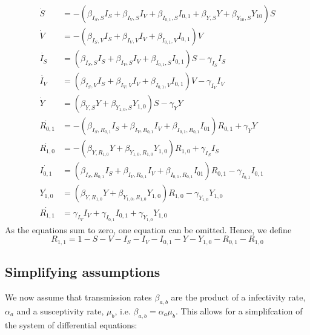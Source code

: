 \documentclass[10pt,a4paper]{article}
\begin{document}
\begin{align}
    \dot{S} &= - \left(\beta_{I_S,S} I_S + \beta_{I_{V},S} I_V  + \beta_{I_{0,1},S} I_{0,1} + \beta_{Y,S} Y + \beta_{Y_{10},S} Y_{10}\right) S \\
    \dot{V} &= - \left(\beta_{I_S,V} I_S + \beta_{I_{V},V} I_V  + \beta_{I_{0,1},V} I_{0,1} \right) V \\ 
    \dot{I_S} &= \left(\beta_{I_S,S} I_S + \beta_{I_{V},S} I_V  + \beta_{I_{0,1},S} I_{0,1} \right) S - \gamma_{I_S} I_S \\
    \dot{I_V} &= \left(\beta_{I_S,V} I_S + \beta_{I_{V},V} I_V  + \beta_{I_{0,1},V} I_{0,1} \right) V - \gamma_{I_V} I_V \\
    \dot{Y} &= \left(\beta_{Y,S} Y + \beta_{Y_{1,0},S} Y_{1,0}\right) S - \gamma_{Y} Y \\
    \dot{R_{0,1}} &= - \left(\beta_{I_S,R_{0,1}} I_S + \beta_{I_{V},R_{0,1}} I_V  + \beta_{I_{0,1},R_{0,1}} I_{01} \right) R_{0,1} + \gamma_{Y} Y \\ 
    \dot{R_{1,0}} &= - \left(\beta_{Y,R_{1,0}} Y + \beta_{Y_{1,0},R_{1,0}} Y_{1,0}\right) R_{1,0} + \gamma_{I_S} I_S \\
    \dot{I_{0,1}} &=   \left(\beta_{I_S,R_{0,1}} I_S + \beta_{I_{V},R_{0,1}} I_V  + \beta_{I_{0,1},R_{0,1}} I_{01} \right) R_{0,1} - \gamma_{I_{0,1}} I_{0,1} \\ 
    \dot{Y_{1,0}} &=   \left(\beta_{Y,R_{1,0}} Y + \beta_{Y_{1,0},R_{1,0}} Y_{1,0}\right) R_{1,0} - \gamma_{Y_{1,0}} Y_{1,0} \\
    \dot{R_{1,1}} &= \gamma_{I_V} I_V + \gamma_{I_{0,1}} I_{0,1} + \gamma_{Y_{1,0}} Y_{1,0}
\end{align}
As the equations sum to zero, one equation can be omitted. Hence, we define 
\begin{equation}
R_{1,1} = 1 - S - V - I_S - I_V - I_{0,1} - Y - Y_{1,0} - R_{0,1} - R_{1,0}
\end{equation}

\subsection{Simplifying assumptions}
We now assume that transmission rates $\beta_{a,b}$ are the product of a infectivity rate, $\alpha_a$ and a susceptivity rate, $\mu_b$, i.e. $\beta_{a,b} = \alpha_a \mu_b$. 
This allows for a simplifcation of the system of differential equations:
\end{document}
